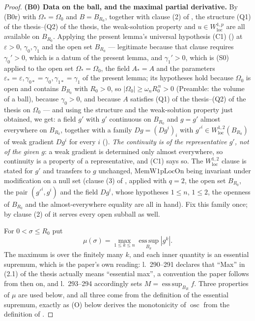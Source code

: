 \begin{proof}
\textbf{(B0) Data on the ball, and the maximal partial derivative.}  By (B0r)
with $\Omega_\ast=\Omega_0$ and $B=B_{R_0}$, together with clause (2) of
, the structure
(Q1) of the thesis--(Q2) of the thesis, the weak-solution property and
$u\in W^{1,p}_{\mathrm{loc}}$ are all available on $B_{R_0}$.  Applying
the present lemma's universal hypothesis (C1)
() at $\varepsilon>0$, $\gamma_0,\gamma_1$ and
the open set $B_{R_0}$ --- legitimate because that clause requires
$\gamma_0'>0$, which is a datum of the present lemma, and
$\gamma_1'>0$, which is (S0) applied to the open set $\Omega_\ast=\Omega_0$,
the field $A_\ast=A$ and the parameters
$\varepsilon_\ast=\varepsilon,\gamma_{0\ast}=\gamma_0,\gamma_{1\ast}=\gamma_1$
of the present lemma; its hypotheses hold because $\Omega_0$ is open and
contains $B_{R_0}$ with $R_0>0$, so $|\Omega_0|\ge\omega_nR_0^{\,n}>0$
(Preamble: the volume of a ball), because $\gamma_0>0$, and because $A$
satisfies (Q1) of the thesis--(Q2) of the thesis on $\Omega_0$ ---
and using the structure and the weak-solution property
just obtained, we get: a field $g'$ with $g'$ continuous on $B_{R_0}$ and
$g=g'$ almost everywhere on $B_{R_0}$, together with a family
$Dg=(Dg^i)_i$ with $g'^i\in W^{1,2}_{\mathrm{loc}}(B_{R_0})$ of weak gradient
$Dg^i$ for every $i$ ().  \emph{The continuity is of the
representative $g'$, not of the given $g$}: a weak gradient is determined only
almost everywhere, so continuity is a property of a representative, and (C1)
says so.  The $W^{1,2}_{\mathrm{loc}}$ clause is stated for $g'$ and transfers
to $g$ unchanged, $\mathrm{MemW1pLocOn}$ being invariant under modification on a
null set (clause (3) of , applied with $q=2$,
the open set $B_{R_0}$, the pair $(g'^i,g^i)$ and the field $Dg^i$, whose
hypotheses $1\le n$, $1\le2$, the openness of $B_{R_0}$ and the
almost-everywhere equality are all in hand).  Fix this family once; by clause
(2) of  it serves every open subball as well.

For $0<\sigma\le R_0$ put
\[
\mu(\sigma)=\max_{1\le k\le n}\operatorname*{ess\,sup}_{B_\sigma}|g^k| .
\]
The maximum is over the finitely many $k$, and each inner quantity is an
essential supremum, which is the paper's own reading: l.~290--291 declares that
``Max'' in (2.1) of the thesis actually means ``essential max'', a convention the
paper follows from then on, and l.~293--294 accordingly sets
$M=\operatorname*{ess\,sup}_{B_R}f$.  Three properties of $\mu$ are used below, and all three come
from the definition of the essential supremum, exactly as (O) below derives the
monotonicity of $\operatorname*{osc}$ from the definition of .


\end{proof}
